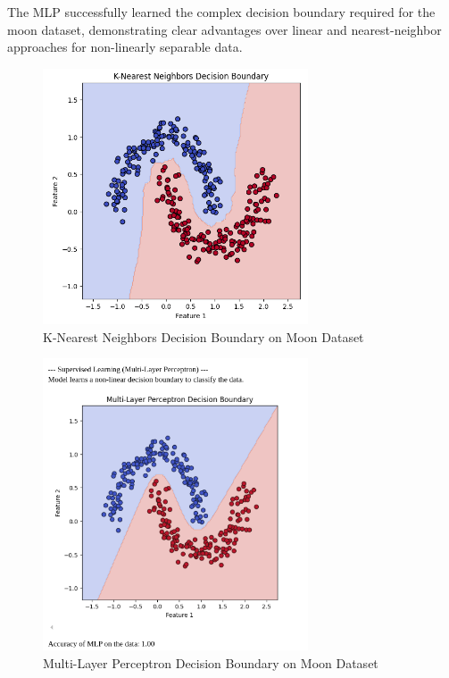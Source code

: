 \documentclass[11pt,a4paper]{article}
\begin{document}
The MLP successfully learned the complex decision boundary required for the moon dataset, demonstrating clear advantages over linear and nearest-neighbor approaches for non-linearly separable data.

\begin{figure}[H]
\centering
\includegraphics[width=0.7\textwidth]{plots/knn1.png}
\caption{K-Nearest Neighbors Decision Boundary on Moon Dataset}
\end{figure}

\begin{figure}[H]
\centering
\includegraphics[width=0.7\textwidth]{plots/knn2.png}
\caption{Multi-Layer Perceptron Decision Boundary on Moon Dataset}
\end{figure}
\end{document}
